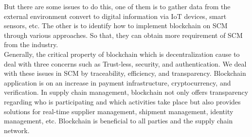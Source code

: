 But there are some issues to do this, one of them is to gather data from the external environment convert to digital information via IoT devices, smart sensors, etc. The other is to identify how to implement blockchain on SCM through various approaches. So that, they can obtain more requirement of SCM from the industry.\\
Generally, the critical property of blockchain which is decentralization cause to deal with three concerns such as Trust-less, security, and authentication. We deal with these issues in SCM by traceability, efficiency, and transparency.
Blockchain application is on an increase in payment infrastructure, cryptocurrency, and verification. In supply chain management, blockchain not only offers transparency regarding who is participating and which activities take place but also provides solutions for real-time supplier management, shipment management, identity management, etc. Blockchain is beneficial to all parties and the supply chain network. \\

